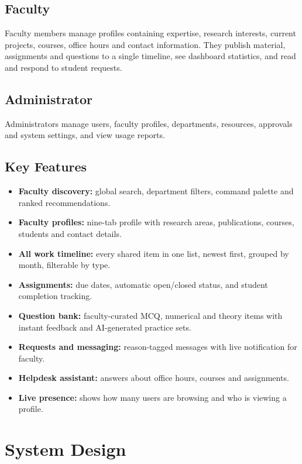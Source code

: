 \documentclass[conference]{IEEEtran}
\begin{document}
\subsection{Faculty}
Faculty members manage profiles containing expertise, research interests, current projects, courses, office hours and contact information. They publish material, assignments and questions to a single timeline, see dashboard statistics, and read and respond to student requests.

\subsection{Administrator}
Administrators manage users, faculty profiles, departments, resources, approvals and system settings, and view usage reports.

\subsection{Key Features}
\begin{itemize}
  \item \textbf{Faculty discovery:} global search, department filters, command palette and ranked recommendations.
  \item \textbf{Faculty profiles:} nine-tab profile with research areas, publications, courses, students and contact details.
  \item \textbf{All work timeline:} every shared item in one list, newest first, grouped by month, filterable by type.
  \item \textbf{Assignments:} due dates, automatic open/closed status, and student completion tracking.
  \item \textbf{Question bank:} faculty-curated MCQ, numerical and theory items with instant feedback and AI-generated practice sets.
  \item \textbf{Requests and messaging:} reason-tagged messages with live notification for faculty.
  \item \textbf{Helpdesk assistant:} answers about office hours, courses and assignments.
  \item \textbf{Live presence:} shows how many users are browsing and who is viewing a profile.
\end{itemize}

\section{System Design}
\end{document}
